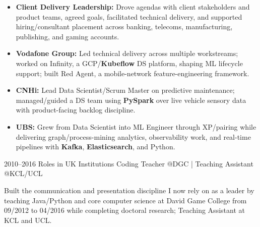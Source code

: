 \documentclass[]{../../friggeri-cv}
\begin{document}
\begin{entrylist}
{{        }
        \begin{itemize}[leftmargin=1.1em]
					            \item \footnotesize\textbf{Client Delivery Leadership:} Drove agendas with client stakeholders and product teams, agreed goals, facilitated technical delivery, and supported hiring/consultant placement across banking, telecoms, manufacturing, publishing, and gaming accounts.
					            \item \footnotesize\textbf{Vodafone Group:} Led technical delivery across multiple workstreams; worked on Infinity, a GCP/\textbf{Kubeflow} DS platform, shaping ML lifecycle support; built Red Agent, a mobile-network feature-engineering framework.
				            \item \footnotesize\textbf{CNHi:} Lead Data Scientist/Scrum Master on predictive maintenance; managed/guided a DS team using \textbf{PySpark} over live vehicle sensory data with product-facing backlog discipline.
			            \item \footnotesize\textbf{UBS:} Grew from Data Scientist into ML Engineer through XP/pairing while delivering graph/process-mining analytics, observability work, and real-time pipelines with \textbf{Kafka}, \textbf{Elasticsearch}, and Python.
	        \end{itemize}
    }
    \entry
    {2010–2016}
    {Roles in UK Institutions}
    {\small Coding Teacher @DGC | Teaching Assistant @KCL/UCL}
    {
        {\small
        \setlength{\parindent}{0pt}
        \setlength{\leftskip}{0pt}
	        Built the communication and presentation discipline I now rely on as a leader by teaching Java/Python and core computer science at David Game College from 09/2012 to 04/2016 while completing doctoral research; Teaching Assistant at KCL and UCL.

	        }
	    }
	\end{entrylist}
	\newpage
	\setlength{\parskip}{2pt}
	\setlength{\parsep}{0pt}
\end{document}
